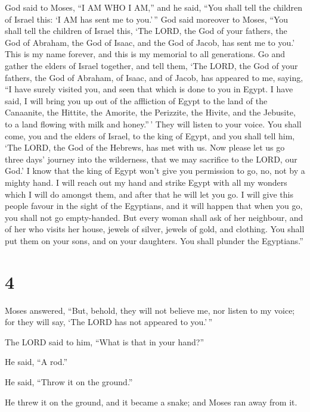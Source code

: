  God said to Moses, ``I AM WHO I AM,'' and he said, ``You
shall tell the children of Israel this: `I AM has sent me to you.'\,''
 God said moreover to Moses, ``You shall tell the
children of Israel this, `The LORD, the God of your fathers, the God of
Abraham, the God of Isaac, and the God of Jacob, has sent me to you.'
This is my name forever, and this is my memorial to all generations.
 Go and gather the elders of Israel together, and tell
them, `The LORD, the God of your fathers, the God of Abraham, of Isaac,
and of Jacob, has appeared to me, saying, ``I have surely visited you,
and seen that which is done to you in Egypt.  I have
said, I will bring you up out of the affliction of Egypt to the land of
the Canaanite, the Hittite, the Amorite, the Perizzite, the Hivite, and
the Jebusite, to a land flowing with milk and honey.''\,'
 They will listen to your voice. You shall come, you and
the elders of Israel, to the king of Egypt, and you shall tell him, `The
LORD, the God of the Hebrews, has met with us. Now please let us go
three days' journey into the wilderness, that we may sacrifice to the
LORD, our God.'  I know that the king of Egypt won't give
you permission to go, no, not by a mighty hand.  I will
reach out my hand and strike Egypt with all my wonders which I will do
amongst them, and after that he will let you go.  I will
give this people favour in the sight of the Egyptians, and it will
happen that when you go, you shall not go empty-handed. 
But every woman shall ask of her neighbour, and of her who visits her
house, jewels of silver, jewels of gold, and clothing. You shall put
them on your sons, and on your daughters. You shall plunder the
Egyptians.''

\hypertarget{section-3}{%
\section{4}\label{section-3}}

 Moses answered, ``But, behold, they will not believe me,
nor listen to my voice; for they will say, `The LORD has not appeared to
you.'\,''

 The LORD said to him, ``What is that in your hand?''

He said, ``A rod.''

 He said, ``Throw it on the ground.''

He threw it on the ground, and it became a snake; and Moses ran away
from it.

